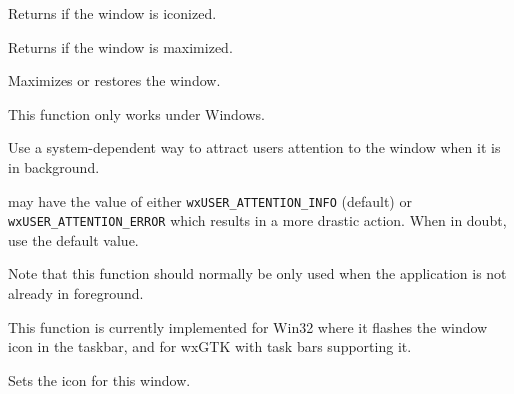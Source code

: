 
Returns \true if the window is iconized.


\label{wxtoplevelwindowismaximized}


Returns \true if the window is maximized.


\label{wxtoplevelwindowmaximize}


Maximizes or restores the window.




This function only works under Windows.




\label{wxtoplevelwindowrequestuserattention}


Use a system-dependent way to attract users attention to the window when it is
in background.

 may have the value of either \texttt{wxUSER\_ATTENTION\_INFO}
(default) or \texttt{wxUSER\_ATTENTION\_ERROR} which results in a more drastic
action. When in doubt, use the default value.

Note that this function should normally be only used when the application is
not already in foreground.

This function is currently implemented for Win32 where it flashes the
window icon in the taskbar, and for wxGTK with task bars supporting it.


\label{wxtoplevelwindowseticon}


Sets the icon for this window.




